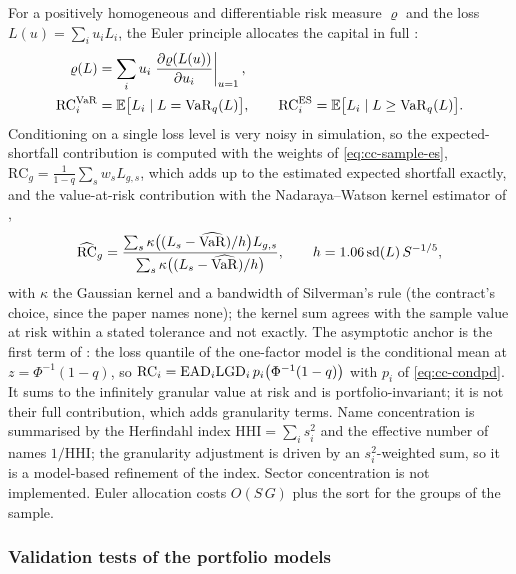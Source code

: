 For a positively homogeneous and differentiable risk measure $\varrho$ and the loss $L(u)=\sum_iu_iL_i$, the Euler principle allocates
the capital in full \citep{credit-capital:tasche2008}:
\begin{equation}
\begin{aligned}
\varrho(L)&=\sum_iu_i\left.\frac{\partial\varrho(L(u))}{\partial u_i}\right|_{u=1},\\
\mathrm{RC}_i^{\operatorname{VaR}}&=\mathbb{E}\big[L_i\mid L=\operatorname{VaR}_q(L)\big],\qquad
\mathrm{RC}_i^{\operatorname{ES}}=\mathbb{E}\big[L_i\mid L\ge\operatorname{VaR}_q(L)\big].
\end{aligned}
\label{eq:cc-euler}
\end{equation}
Conditioning on a single loss level is very noisy in simulation, so the expected-shortfall contribution is computed with the weights
of \cref{eq:cc-sample-es}, $\mathrm{RC}_g=\frac1{1-q}\sum_sw_sL_{g,s}$, which adds up to the estimated expected shortfall exactly, and the
value-at-risk contribution with the Nadaraya--Watson kernel estimator of \citet{credit-capital:tasche2009},
\begin{equation}
\widehat{\mathrm{RC}}_g=\frac{\sum_s\kappa\big((L_s-\widehat{\operatorname{VaR}})/h\big)L_{g,s}}{\sum_s\kappa\big((L_s-\widehat{\operatorname{VaR}})/h\big)},\qquad h=1.06\,\mathrm{sd}(L)\,S^{-1/5},
\label{eq:cc-kernel}
\end{equation}
with $\kappa$ the Gaussian kernel and a bandwidth of Silverman's rule (the contract's choice, since the paper names none); the kernel sum
agrees with the sample value at risk within a stated tolerance and not exactly. The asymptotic anchor is the first term of
\citet{credit-capital:emmertasche2005}: the loss quantile of the one-factor model is the conditional mean at $z=\Phi^{-1}(1-q)$, so
$\mathrm{RC}_i=\mathrm{EAD}_i\mathrm{LGD}_i\,p_i\big(\Phi^{-1}(1-q)\big)$ with $p_i$ of \cref{eq:cc-condpd}. It sums to the infinitely granular value at
risk and is portfolio-invariant; it is not their full contribution, which adds granularity terms. Name concentration is summarised by the
Herfindahl index $\mathrm{HHI}=\sum_is_i^2$ and the effective number of names $1/\mathrm{HHI}$; the granularity adjustment is driven by an
$s_i^2$-weighted sum, so it is a model-based refinement of the index. Sector concentration \citep{credit-capital:dullmannmasschelein2007}
is not implemented. Euler allocation costs $O(S\,G)$ plus the sort for the groups of the sample.

\subsubsection{Validation tests of the portfolio models}

